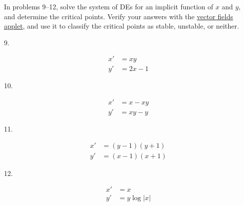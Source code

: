 \documentclass{article}
\begin{document}
In problems 9--12, solve the system of DEs for an implicit function of $x$ and $y$, and determine the critical points. Verify your answers with the \href{https://cruzgodar.com/applets/vector-fields}{vector fields applet}, and use it to classify the critical points as stable, unstable, or neither.

9.

\begin{align*}
	x' &= xy\\
	y' &= 2x - 1
\end{align*}

10.

\begin{align*}
	x' &= x - xy\\
	y' &= xy - y
\end{align*}

11.

\begin{align*}
	x' &= (y - 1)(y + 1)\\
	y' &= (x - 1)(x + 1)
\end{align*}

12.

\begin{align*}
	x' &= x\\
	y' &= y\log|x|
\end{align*}
\end{document}
